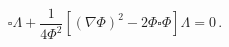\begin{equation*}
\square \Lambda +\frac{1}{4\Phi ^{2}}\left[ \left( \nabla \Phi \right)
^{2}-2\Phi \square \Phi \right] \Lambda =0\,.
\end{equation*}

